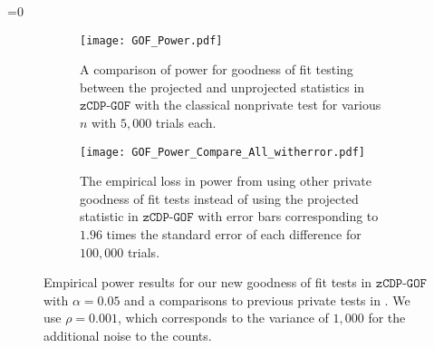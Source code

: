 \documentclass[twoside,letterpaper]{article} \usepackage{aistats2017}
\theoremstyle{definition}
\theoremstyle{remark}
\begin{document}
=0
\begin{figure}
\begin{center}
\begin{subfigure}{.45\textwidth}
\texttt{[image: GOF\_Power.pdf]}
\begin{flushleft}
\caption{A comparison of power for goodness of fit testing between the projected and unprojected statistics in ${\texttt{zCDP-GOF}}$ with the classical nonprivate test for various $n$ with $5,000$ trials each.  \label{fig:power_gof}}
\end{flushleft}
\end{subfigure}
\hspace{10mm}
\begin{subfigure}{.45\textwidth}
\begin{flushright}
\texttt{[image: GOF\_Power\_Compare\_All\_witherror.pdf]}
\caption{The empirical loss in power from using other private goodness of fit tests instead of using the projected statistic in ${\texttt{zCDP-GOF}}$ with error bars corresponding to $1.96$ times the standard error of each difference for $100,000$ trials. \label{fig:power_gof_compare}}
\end{flushright}
\end{subfigure}
\caption{Empirical power results for our new goodness of fit tests in ${\texttt{zCDP-GOF}}$ with $\alpha = 0.05$ and a comparisons to previous private tests in \cite{GLRV16}.  We use $\rho = 0.001$, which corresponds to the variance of $1,000$ for the additional noise to the counts. }
\end{center}
\end{figure}
\fi
\end{document}
